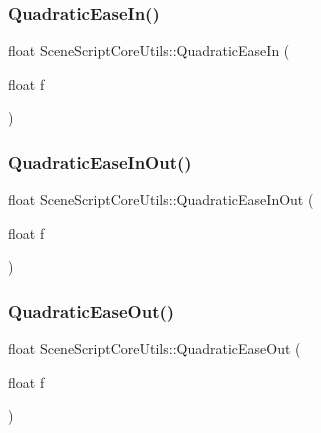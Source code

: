 \hypertarget{class_scene_script_core_utils_ad6b11465209bf1918e3ac3801cb6fad0}{}\label{class_scene_script_core_utils_ad6b11465209bf1918e3ac3801cb6fad0} 
\subsubsection{\texorpdfstring{Quadratic\+Ease\+In()}{QuadraticEaseIn()}}
{\footnotesize\ttfamily float Scene\+Script\+Core\+Utils\+::\+Quadratic\+Ease\+In (\begin{DoxyParamCaption}\item[{float}]{f }\end{DoxyParamCaption})}

\hypertarget{class_scene_script_core_utils_ae9c379d922a3ce3aed2bb730484ed61d}{}\label{class_scene_script_core_utils_ae9c379d922a3ce3aed2bb730484ed61d} 
\subsubsection{\texorpdfstring{Quadratic\+Ease\+In\+Out()}{QuadraticEaseInOut()}}
{\footnotesize\ttfamily float Scene\+Script\+Core\+Utils\+::\+Quadratic\+Ease\+In\+Out (\begin{DoxyParamCaption}\item[{float}]{f }\end{DoxyParamCaption})}

\hypertarget{class_scene_script_core_utils_aad772d9017b7e90b52437a80d0b7bde2}{}\label{class_scene_script_core_utils_aad772d9017b7e90b52437a80d0b7bde2} 
\subsubsection{\texorpdfstring{Quadratic\+Ease\+Out()}{QuadraticEaseOut()}}
{\footnotesize\ttfamily float Scene\+Script\+Core\+Utils\+::\+Quadratic\+Ease\+Out (\begin{DoxyParamCaption}\item[{float}]{f }\end{DoxyParamCaption})}

